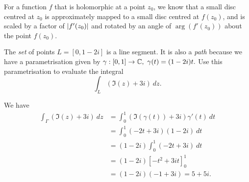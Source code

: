 \begin{questions}
\begin{answer}
For a function $f$ that is holomorphic at a point $z_0$, we know that a small disc centred at $z_0$ is approximately mapped to a small disc centred at $f(z_0)$, and is scaled by a factor of $\left| f'(z_0) \right|$ and rotated by an angle of $\arg (f'(z_0))$ about the point $f(z_0)$.
\end{answer}
\question  The \emph{set} of points $L=[0,1-2i]$ is a line segment.  It is also a \emph{path} because we have a parametrisation given by  $\gamma:[0,1] \to \mathbb{C},\ \gamma(t) = (1-2i)t.$  Use this parametrisation to evaluate the integral
\[
\int_L \left( \Im (z) + 3i \right)\ dz.
\]
\begin{answer}

We have
\begin{align*}
\int_{\Gamma} ( \Im (z) + 3i )\ dz & = \int_0^1 \left( \Im ( \gamma (t) ) +3i \right) \gamma' (t)\ dt \\
& = \int_0^1 \left( -2t + 3i \right) (1-2i)\ dt \\
& = (1-2i) \int_0^1 (-2t +3i)\ dt \\
& = (1-2i) \left[ - t^2 +3it \right]_0^1 \\
& = (1-2i)(-1+3i) = 5 + 5i.
\end{align*}


\end{answer}
\end{questions}
